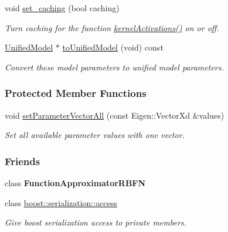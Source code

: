 \begin{DoxyCompactItemize}
void \hyperlink{classDmpBbo_1_1ModelParametersRBFN_a9defb2d398362ff5663a1fde70903651}{set\+\_\+caching} (bool caching)
\begin{DoxyCompactList}\small\item\em Turn caching for the function \hyperlink{classDmpBbo_1_1ModelParametersRBFN_a125cc60559b55f7348beb15f25834b6f}{kernel\+Activations()} on or off. \end{DoxyCompactList}\item 
\hyperlink{classDmpBbo_1_1UnifiedModel}{Unified\+Model} $\ast$ \hyperlink{classDmpBbo_1_1ModelParametersRBFN_a6e3534f93333334c2f0126f8fc4d29d1}{to\+Unified\+Model} (void) const 
\begin{DoxyCompactList}\small\item\em Convert these model parameters to unified model parameters. \end{DoxyCompactList}\end{DoxyCompactItemize}
\subsubsection*{Protected Member Functions}
\begin{DoxyCompactItemize}
\item 
void \hyperlink{classDmpBbo_1_1ModelParametersRBFN_a9d3c8f22e8237a805af4935a647e5a50}{set\+Parameter\+Vector\+All} (const Eigen\+::\+Vector\+Xd \&values)
\begin{DoxyCompactList}\small\item\em Set all available parameter values with one vector. \end{DoxyCompactList}\end{DoxyCompactItemize}
\subsubsection*{Friends}
\begin{DoxyCompactItemize}
\item 
\hypertarget{classDmpBbo_1_1ModelParametersRBFN_a4d78a827d8b424d4246a1f5763e79fdb}{class {\bfseries Function\+Approximator\+R\+B\+F\+N}}\label{classDmpBbo_1_1ModelParametersRBFN_a4d78a827d8b424d4246a1f5763e79fdb}

\item 
class \hyperlink{classDmpBbo_1_1ModelParametersRBFN_ac98d07dd8f7b70e16ccb9a01abf56b9c}{boost\+::serialization\+::access}
\begin{DoxyCompactList}\small\item\em Give boost serialization access to private members. \end{DoxyCompactList}\end{DoxyCompactItemize}


